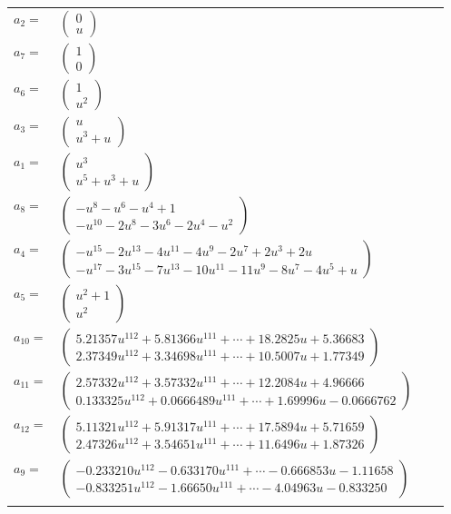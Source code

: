 \documentclass[1p]{elsarticle_modified}
\theoremstyle{definition}
\begin{document}
\begin{tabular}{m{7pt} m{180pt} m{7pt} m{180pt} }
\flushright $a_{2}=$&$\begin{pmatrix}0\\u\end{pmatrix}$ \\
\flushright $a_{7}=$&$\begin{pmatrix}1\\0\end{pmatrix}$ \\
\flushright $a_{6}=$&$\begin{pmatrix}1\\u^2\end{pmatrix}$ \\
\flushright $a_{3}=$&$\begin{pmatrix}u\\u^3+u\end{pmatrix}$ \\
\flushright $a_{1}=$&$\begin{pmatrix}u^3\\u^5+u^3+u\end{pmatrix}$ \\
\flushright $a_{8}=$&$\begin{pmatrix}- u^8- u^6- u^4+1\\- u^{10}-2 u^8-3 u^6-2 u^4- u^2\end{pmatrix}$ \\
\flushright $a_{4}=$&$\begin{pmatrix}- u^{15}-2 u^{13}-4 u^{11}-4 u^9-2 u^7+2 u^3+2 u\\- u^{17}-3 u^{15}-7 u^{13}-10 u^{11}-11 u^9-8 u^7-4 u^5+u\end{pmatrix}$ \\
\flushright $a_{5}=$&$\begin{pmatrix}u^2+1\\u^2\end{pmatrix}$ \\
\flushright $a_{10}=$&$\begin{pmatrix}5.21357 u^{112}+5.81366 u^{111}+\cdots+18.2825 u+5.36683\\2.37349 u^{112}+3.34698 u^{111}+\cdots+10.5007 u+1.77349\end{pmatrix}$ \\
\flushright $a_{11}=$&$\begin{pmatrix}2.57332 u^{112}+3.57332 u^{111}+\cdots+12.2084 u+4.96666\\0.133325 u^{112}+0.0666489 u^{111}+\cdots+1.69996 u-0.0666762\end{pmatrix}$ \\
\flushright $a_{12}=$&$\begin{pmatrix}5.11321 u^{112}+5.91317 u^{111}+\cdots+17.5894 u+5.71659\\2.47326 u^{112}+3.54651 u^{111}+\cdots+11.6496 u+1.87326\end{pmatrix}$ \\
\flushright $a_{9}=$&$\begin{pmatrix}-0.233210 u^{112}-0.633170 u^{111}+\cdots-0.666853 u-1.11658\\-0.833251 u^{112}-1.66650 u^{111}+\cdots-4.04963 u-0.833250\end{pmatrix}$\\&\end{tabular}
\end{document}

